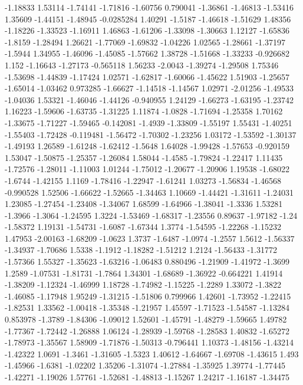 \documentclass[9pt]{article}
\theoremstyle{plain}
\theoremstyle{definition}
\theoremstyle{remark}
\numberwithin{equation}{section}
\begin{document}
-1.18833
1.53114
-1.74141
-1.71816
-1.60756
0.790041
-1.36861
-1.46813
-1.53416
1.35609
-1.44151
-1.48945
-0.0285284
1.40291
-1.5187
-1.46618
-1.51629
1.48356
-1.18226
-1.33523
-1.16911
1.46863
-1.61206
-1.33098
-1.30663
1.12127
-1.65836
-1.8159
-1.28494
1.26621
-1.77069
-1.69832
-1.04226
1.02565
-1.28661
-1.37197
-1.5944
1.34955
-1.46096
-1.45085
-1.57662
1.38728
-1.51668
-1.33233
-0.926682
1.152
-1.16643
-1.27173
-0.565118
1.56233
-2.0043
-1.39274
-1.29508
1.75346
-1.53698
-1.44839
-1.17424
1.02571
-1.62817
-1.60066
-1.45622
1.51903
-1.25657
-1.65014
-1.03462
0.973285
-1.66627
-1.14518
-1.14567
1.02971
-2.01256
-1.49533
-1.04036
1.53321
-1.46046
-1.44126
-0.940955
1.24129
-1.66273
-1.63195
-1.23742
1.16223
-1.59606
-1.63735
-1.31225
1.11874
-1.0828
-1.71694
-1.25358
1.70162
-1.33675
-1.71227
-1.59465
-0.142081
-1.4939
-1.33809
-1.55197
1.55431
-1.40251
-1.55403
-1.72428
-0.119481
-1.56472
-1.70302
-1.23256
1.03172
-1.53592
-1.30137
-1.49193
1.26589
-1.61248
-1.62412
-1.5648
1.64028
-1.99428
-1.57653
-0.920159
1.53047
-1.50875
-1.25357
-1.26084
1.58044
-1.4585
-1.79824
-1.22417
1.11435
-1.72576
-1.28011
-1.11003
1.01244
-1.75012
-1.20677
-1.20906
1.19538
-1.68022
-1.6744
-1.42155
1.1169
-1.78416
-1.22947
-1.61241
1.03273
-1.56834
-1.46568
-0.990528
1.52506
-1.66622
-1.52665
-1.34463
1.10669
-1.44421
-1.31611
-1.24031
1.23085
-1.27454
-1.23408
-1.34067
1.68599
-1.64966
-1.38041
-1.3336
1.53281
-1.3966
-1.3064
-1.24595
1.3224
-1.53469
-1.68317
-1.23556
0.89637
-1.97182
-1.24
-1.58372
1.19131
-1.54731
-1.6087
-1.67344
1.3774
-1.54595
-1.22268
-1.15232
1.47953
-2.00163
-1.68209
-1.0623
1.3737
-1.6487
-1.0974
-1.2557
1.5612
-1.56337
-1.34937
-1.70686
1.5338
-1.1912
-1.18282
-1.51212
1.2124
-1.56433
-1.31772
-1.57366
1.55327
-1.35623
-1.63216
-1.06483
0.880496
-1.21909
-1.41972
-1.3699
1.2589
-1.07531
-1.81731
-1.7864
1.34301
-1.68689
-1.36922
-0.664221
1.41914
-1.38209
-1.12324
-1.46999
1.18728
-1.74982
-1.15225
-1.2289
1.33072
-1.3822
-1.46085
-1.17948
1.95249
-1.31215
-1.51806
0.799966
1.42601
-1.73952
-1.22415
-1.82531
1.33562
-1.00418
-1.35348
-1.21957
1.45597
-1.71523
-1.54587
-1.13284
0.853978
-1.3789
-1.84306
-1.09012
1.52601
-1.45791
-1.48279
-1.59665
1.49782
-1.77367
-1.72442
-1.26888
1.06124
-1.28939
-1.59768
-1.28583
1.40832
-1.65272
-1.78973
-1.35567
1.58909
-1.71876
-1.50313
-0.796441
1.10373
-1.48156
-1.43214
-1.42322
1.0691
-1.3461
-1.31605
-1.5323
1.40612
-1.64667
-1.69708
-1.43615
1.493
-1.45966
-1.6381
-1.02202
1.35206
-1.31074
-1.27884
-1.35925
1.39774
-1.77445
-1.42271
-1.19026
1.57761
-1.52681
-1.48813
-1.15267
1.24217
-1.16187
-1.34475
\end{document}
